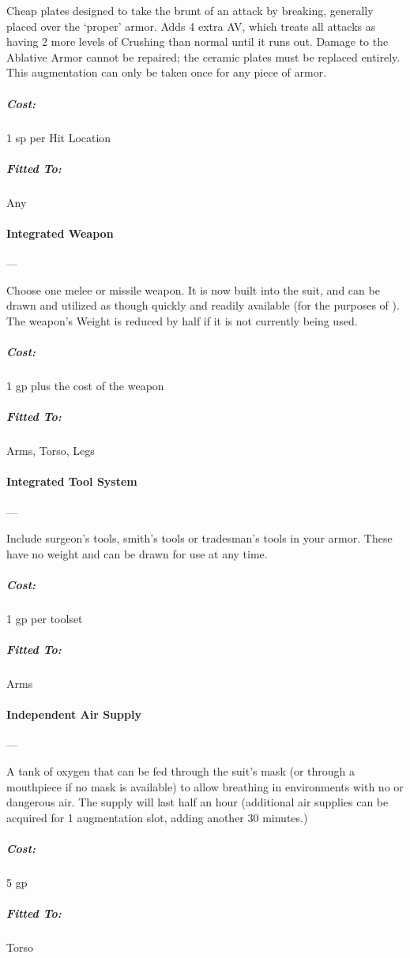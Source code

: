 \documentclass[oneside,11pt,english]{book}
\begin{document}
Cheap plates designed to take the brunt of an attack by breaking, generally placed over the ‘proper’ armor. Adds 4 extra AV, which treats all attacks as having 2 more levels of Crushing than normal until it runs out. Damage to the Ablative Armor cannot be repaired; the ceramic plates must be replaced entirely. This augmentation can only be taken once for any piece of armor. 
\vspace{-15pt}\subparagraph{Cost:} 1 sp per Hit Location
\vspace{-15pt}\subparagraph{Fitted To:} Any

\paragraph{Integrated Weapon}---

Choose one melee or missile weapon. It is now built into the suit, and can be drawn and utilized as though 
quickly and readily available (for the purposes of ). The weapon’s Weight is reduced by half if it is not currently being used.
\vspace{-15pt}\subparagraph{Cost:} 1 gp plus the cost of the weapon
\vspace{-15pt}\subparagraph{Fitted To:} Arms, Torso, Legs

\paragraph{Integrated Tool System}---

Include surgeon’s tools, smith’s tools or tradesman’s tools in your armor. These have no weight and can 
be drawn for use at any time.
\vspace{-15pt}\subparagraph{Cost:} 1 gp per toolset
\vspace{-15pt}\subparagraph{Fitted To:} Arms

\paragraph{Independent Air Supply}---\quad[2/1]

A tank of oxygen that can be fed through the suit’s mask (or through a mouthpiece if no mask is available) to allow breathing in environments with no or dangerous air. The supply will last half an hour (additional air supplies can be acquired for 1 augmentation slot, adding another 30 minutes.)
\vspace{-15pt}\subparagraph{Cost:} 5 gp
\vspace{-15pt}\subparagraph{Fitted To:} Torso
\end{document}
